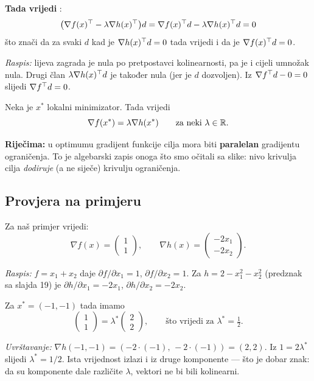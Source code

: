 \textbf{Tada vrijedi} :
\[
\big(\nabla f(x)^{\top} - \lambda\nabla h(x)^{\top}\big)d
= \nabla f(x)^{\top} d - \lambda\nabla h(x)^{\top} d = 0
\]
što znači da za svaki $d$ kad je $\nabla h(x)^{\top} d = 0$ tada vrijedi i da je
$\nabla f(x)^{\top} d = 0$.

\emph{Raspis:} lijeva zagrada je nula po pretpostavci kolinearnosti, pa je i
cijeli umnožak nula. Drugi član $\lambda\nabla h(x)^{\top} d$ je također nula (jer je
$d$ dozvoljen). Iz $\nabla f^{\top} d - 0 = 0$ slijedi $\nabla f^{\top} d = 0$.
\checkmark

\begin{teorem}
Neka je $x^{*}$ lokalni minimizator. Tada vrijedi
\[
\nabla f(x^{*}) = \lambda\nabla h(x^{*}) \qquad\text{za neki } \lambda \in \mathbb{R}.
\]
\end{teorem}

\textbf{Riječima:} u optimumu gradijent funkcije cilja mora biti \textbf{paralelan}
gradijentu ograničenja. To je algebarski zapis onoga što smo očitali sa slike:
nivo krivulja cilja \emph{dodiruje} (a ne siječe) krivulju ograničenja.

\subsection{Provjera na primjeru}

Za naš primjer vrijedi:
\[
\nabla f(x) = \begin{pmatrix} 1 \\ 1 \end{pmatrix}, \qquad
\nabla h(x) = \begin{pmatrix} -2x_1 \\ -2x_2 \end{pmatrix}.
\]

\emph{Raspis:} $f = x_1 + x_2$ daje $\partial f/\partial x_1 = 1$,
$\partial f/\partial x_2 = 1$. Za $h = 2 - x_1^2 - x_2^2$ (predznak sa slajda
19) je $\partial h/\partial x_1 = -2x_1$, $\partial h/\partial x_2 = -2x_2$.
\checkmark

Za $x^{*} = (-1, -1)$ tada imamo
\[
\begin{pmatrix} 1 \\ 1 \end{pmatrix}
= \lambda^{*}\begin{pmatrix} 2 \\ 2 \end{pmatrix},
\qquad\text{što vrijedi za } \lambda^{*} = \tfrac{1}{2}.
\]

\emph{Uvrštavanje:} $\nabla h(-1,-1) = (-2\cdot(-1),\, -2\cdot(-1)) = (2, 2)$.
Iz $1 = 2\lambda^{*}$ slijedi $\lambda^{*} = 1/2$. Ista vrijednost izlazi i iz
druge komponente --- što je dobar znak: da su komponente dale različite
$\lambda$, vektori ne bi bili kolinearni. \checkmark

